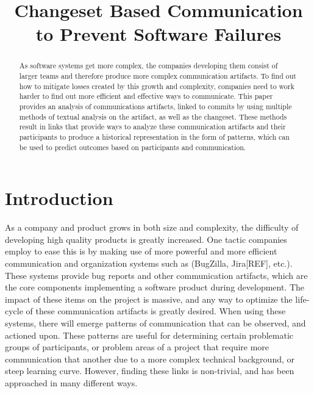 \documentclass[conference]{IEEEtran}
\begin{document}
\title{Changeset Based Communication to Prevent Software Failures}

\author{
\and
{}
\and
{}
}

\maketitle

\begin{abstract}
As software systems get more complex, the companies developing them consist of larger teams and therefore produce more complex communication artifacts.  To find out how to mitigate losses created by this growth and complexity, companies need to work harder to find out more efficient and effective ways to communicate.  This paper provides an analysis of communications artifacts, linked to commits by using multiple methods of textual analysis on the artifact, as well as the changeset.  These methods result in links that provide ways to analyze these communication artifacts and their participants to produce a historical representation in the form of patterns, which can be used to predict outcomes based on participants and communication.
\end{abstract}

\section{Introduction}
As a company and product grows in both size and complexity, the difficulty of developing high quality products is greatly increased.  One tactic companies employ to ease this is by making use of more powerful and more efficient communication and organization systems such as (BugZilla, Jira[REF], etc.).  These systems provide bug reports and other communication artifacts, which are the core components implementing a software product during development.  The impact of these items on the project is massive, and any way to optimize the life-cycle of these communication artifacts is greatly desired.  When using these systems, there will emerge patterns of communication that can be observed, and actioned upon.  These patterns are useful for determining certain problematic groups of participants, or problem areas of a project that require more communication that another due to a more complex technical background, or steep learning curve.  However, finding these links is non-trivial, and has been approached in many different ways.
\end{document}
